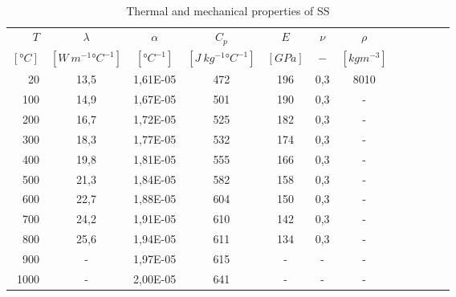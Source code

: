 \\
\begin{table}\centering
    \begin{tabular}{@{}rccccccccccc@{}}\toprule
    $T$ & $\lambda$ & $\alpha$ & $C_p$ & $E$ & $\nu$ & $\rho$\\
    \cmidrule{1-7}
    $[\si{\degree} C]$ & $[W \ m^{-1} \si{\degree} C^{-1}]$ & $[\si{\degree} C^{-1}]$ & $[J \ kg^{-1} \si{\degree} C^{-1}]$ & $[GPa]$ & $-$ & $[kg m^{-3}]$\\
    \midrule
    20 & 13,5 & 1,61E-05 & 472 & 196 & 0,3 & 8010 \\
    100 & 14,9 & 1,67E-05 & 501 & 190 & 0,3 & - \\
    200 & 16,7 & 1,72E-05 & 525 & 182 & 0,3 & - \\
    300 & 18,3 & 1,77E-05 & 532 & 174 & 0,3 & - \\
    400 & 19,8 & 1,81E-05 & 555 & 166 & 0,3 & - \\
    500 & 21,3 & 1,84E-05 & 582 & 158 & 0,3 & - \\
    600 & 22,7 & 1,88E-05 & 604 & 150 & 0,3 & - \\
    700 & 24,2 & 1,91E-05 & 610 & 142 & 0,3 & - \\
    800 & 25,6 & 1,94E-05 & 611 & 134 & 0,3 & - \\
    900 & - & 1,97E-05 & 615 & - & - & - \\
    1000 & - & 2,00E-05 & 641 & - & - & - \\
\bottomrule
\end{tabular}
\caption{Thermal and mechanical properties of \acrlong{SS}}
\end{table}

\newpage